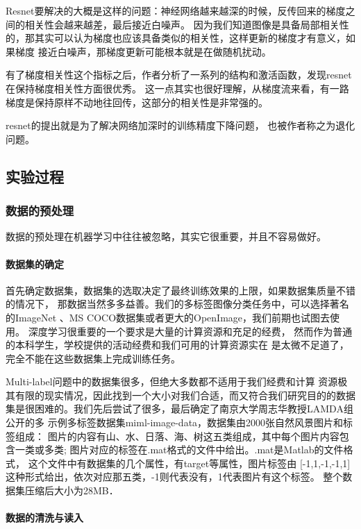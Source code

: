 Resnet要解决的大概是这样的问题：神经网络越来越深的时候，反传回来的梯度之间的相关性会越来越差，最后接近白噪声。
因为我们知道图像是具备局部相关性的，那其实可以认为梯度也应该具备类似的相关性，这样更新的梯度才有意义，如果梯度
接近白噪声，那梯度更新可能根本就是在做随机扰动。

有了梯度相关性这个指标之后，作者分析了一系列的结构和激活函数，发现resnet在保持梯度相关性方面很优秀。
这一点其实也很好理解，从梯度流来看，有一路梯度是保持原样不动地往回传，这部分的相关性是非常强的。

resnet的提出就是为了解决网络加深时的训练精度下降问题， 也被作者称之为退化问题。

\subsection{实验过程}
\subsubsection{数据的预处理}

数据的预处理在机器学习中往往被忽略，其实它很重要，并且不容易做好。

\paragraph{数据集的确定}

首先确定数据集，数据集的选取决定了最终训练效果的上限，如果数据集质量不错的情况下，
那数据当然多多益善。我们的多标签图像分类任务中，可以选择著名的ImageNet
、MS COCO数据集或者更大的OpenImage，我们前期也试图去使用。
深度学习很重要的一个要求是大量的计算资源和充足的经费，
然而作为普通的本科学生，学校提供的活动经费和我们可用的计算资源实在
是太微不足道了，完全不能在这些数据集上完成训练任务。

Multi-label问题中的数据集很多，但绝大多数都不适用于我们经费和计算
资源极其有限的现实情况，因此找到一个大小对我们合适，而又符合我们研究目的的数据
集是很困难的。我们先后尝试了很多，最后确定了南京大学周志华教授LAMDA组公开的多
示例多标签数据集miml-image-data，数据集由2000张自然风景图片和标签组成：
图片的内容有山、水、日落、海、树这五类组成，其中每个图片内容包含一类或多类;
图片对应的标签在.mat格式的文件中给出。.mat是Matlab的文件格式，
这个文件中有数据集的几个属性，有target等属性，图片标签由
[-1,1,-1,-1,1]这种形式给出，依次对应那五类，-1则代表没有，1代表图片有这个标签。
整个数据集压缩后大小为28MB．

\paragraph{数据的清洗与读入}

